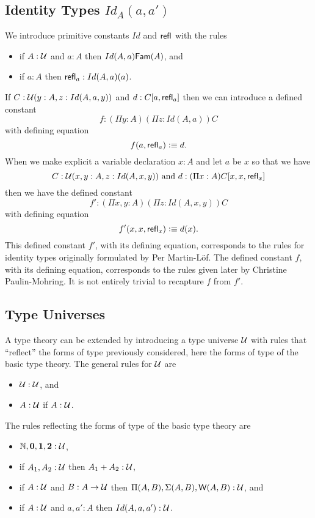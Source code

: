 \subsection*{Identity Types $Id_A(a,a')$}
We introduce primitive constants $Id$ and $\mathsf{refl}_{}$ with the rules
\begin{itemize}
\item if $A : \mathcal{U}$ and $a:A$ then $Id(A,a){\sf Fam}(A)$, and
\item if $a:A$ then $\mathsf{refl}_{a}:Id(A,a)(a)$.
\end{itemize}
If $C : \mathcal{U}(y:A,z:Id(A,a,y))$ and $d:C[a,\mathsf{refl}_{a}]$ then we can introduce a defined constant 
\[
  f:(\Pi y:A)(\Pi z:Id(A,a))C
\]
with defining equation
  \[ f(a,\mathsf{refl}_{a})\vcentcolon\equiv d.\]
When we make explicit a variable declaration $x:A$ 
and let $a$ be $x$ 
so that we have 
\[
  C : \mathcal{U}(x,y:A, z:Id(A,x,y))\mbox{ and  }d:(\Pi x:A)C[x,x,\mathsf{refl}_{x}]
\]
then we have the defined constant
\[
  f':(\Pi x,y:A)(\Pi z:Id(A,x,y))C
\]
with defining equation
\[
  f'(x,x,\mathsf{refl}_{x})\vcentcolon\equiv d(x).
\]
This defined constant $f'$, with its defining equation, corresponds to the rules for identity types originally formulated by Per Martin-L\"{o}f.   The defined constant $f$, with its defining equation, corresponds to the rules given later by Christine Paulin-Mohring.  It is not entirely trivial to recapture $f$ from $f'$.


\subsection*{Type Universes}

 A type theory can be extended by introducing a type universe $\mathcal{U}$ with rules that ``reflect'' the forms of type previously considered, here the forms of type of the basic type theory.  The general rules for $\mathcal{U}$ are

\begin{itemize}
\item $\mathcal{U} : \mathcal{U}$, and
\item $A : \mathcal{U}$ if $A:\mathcal{U}$.
\end{itemize}

The rules reflecting the forms of type of the basic type theory are

\begin{itemize}
\item $\mathbb{N},\mathbf{0},\mathbf{1},\mathbf{2}:\mathcal{U}$,
\item if $A_1,A_2:\mathcal{U}$ then $A_1+A_2:\mathcal{U}$,
\item if $A:\mathcal{U}$ and $B:A\rightarrow\mathcal{U}$ then     $\Pi(A,B),\Sigma(A,B),{\sf W}(A,B):\mathcal{U}$, and 
\item if $A:\mathcal{U}$ and $a,a':A$ then $Id(A,a,a'):\mathcal{U}$.
\end{itemize}

